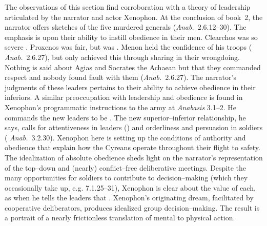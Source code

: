 \documentclass[12pt,letterpaper,oneside,final]{memoir}
\begin{document}
The observations of this section find corroboration with a theory of leadership articulated by the narrator and actor Xenophon. At the conclusion of book~2, the narrator offers sketches of the five murdered generals (\emph{Anab.}~2.6.12--30). The emphasis is upon their ability to instill obedience in their men. Clearchos was so severe . Proxenos was fair, but was . Menon held the confidence of his troops (  \emph{Anab.}~2.6.27), but only achieved this through sharing in their wrongdoing. Nothing is said about Agias and Socrates the Achaean but that they commanded respect and nobody found fault with them (\emph{Anab.}~2.6.27). The narrator's judgments of these leaders pertains to their ability to achieve obedience in their inferiors. A similar preoccupation with leadership and obedience is found in Xenophon's programmatic instructions to the army at \emph{Anabasis} 3.1--2. He commands the new leaders to be . The new superior--inferior relationship, he says, calls for attentiveness in leaders () and orderliness and persuasion in soldiers ( \emph{Anab.}~3.2.30). Xenophon here is setting up the conditions of authority and obedience that explain how the Cyreans operate throughout their flight to safety. The idealization of absolute obedience sheds light on the narrator's representation of the top--down and (nearly) conflict--free deliberative meetings. Despite the many opportunities for soldiers to contribute to decision--making (which they occasionally take up, e.g. 7.1.25--31), Xenophon is clear about the value of each, as when he tells the leaders that . Xenophon's originating dream, facilitated by cooperative deliberators, produces idealized group decision--making. The result is a portrait of a nearly frictionless translation of mental to physical action.
\end{document}
